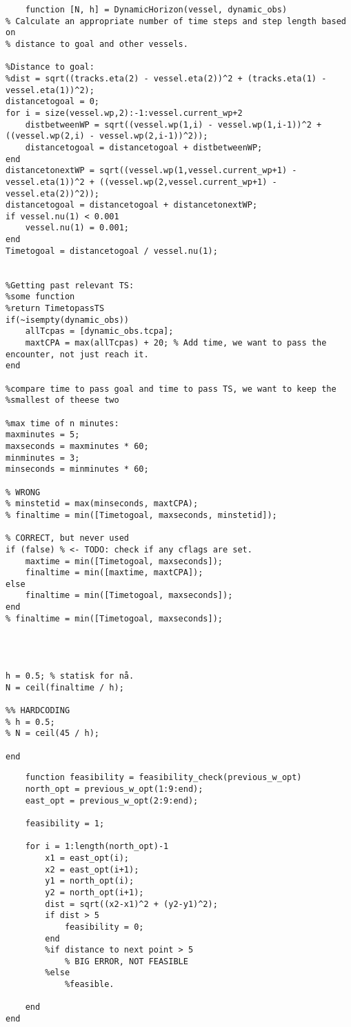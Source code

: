 \clearpage
\begin{lstlisting}
    function [N, h] = DynamicHorizon(vessel, dynamic_obs)
% Calculate an appropriate number of time steps and step length based on
% distance to goal and other vessels.

%Distance to goal:
%dist = sqrt((tracks.eta(2) - vessel.eta(2))^2 + (tracks.eta(1) - vessel.eta(1))^2);
distancetogoal = 0;
for i = size(vessel.wp,2):-1:vessel.current_wp+2
    distbetweenWP = sqrt((vessel.wp(1,i) - vessel.wp(1,i-1))^2 + ((vessel.wp(2,i) - vessel.wp(2,i-1))^2));
    distancetogoal = distancetogoal + distbetweenWP;
end
distancetonextWP = sqrt((vessel.wp(1,vessel.current_wp+1) - vessel.eta(1))^2 + ((vessel.wp(2,vessel.current_wp+1) - vessel.eta(2))^2));
distancetogoal = distancetogoal + distancetonextWP;
if vessel.nu(1) < 0.001
    vessel.nu(1) = 0.001;
end
Timetogoal = distancetogoal / vessel.nu(1);


%Getting past relevant TS:
%some function
%return TimetopassTS
if(~isempty(dynamic_obs))
    allTcpas = [dynamic_obs.tcpa];
    maxtCPA = max(allTcpas) + 20; % Add time, we want to pass the encounter, not just reach it.
end

%compare time to pass goal and time to pass TS, we want to keep the
%smallest of theese two

%max time of n minutes:
maxminutes = 5; 
maxseconds = maxminutes * 60;
minminutes = 3;
minseconds = minminutes * 60;

% WRONG
% minstetid = max(minseconds, maxtCPA);
% finaltime = min([Timetogoal, maxseconds, minstetid]);

% CORRECT, but never used
if (false) % <- TODO: check if any cflags are set.
    maxtime = min([Timetogoal, maxseconds]);
    finaltime = min([maxtime, maxtCPA]); 
else
    finaltime = min([Timetogoal, maxseconds]);
end
% finaltime = min([Timetogoal, maxseconds]);




h = 0.5; % statisk for nå.
N = ceil(finaltime / h);

%% HARDCODING
% h = 0.5;
% N = ceil(45 / h);

end
\end{lstlisting}

\clearpage
\begin{lstlisting}
    function feasibility = feasibility_check(previous_w_opt)
    north_opt = previous_w_opt(1:9:end);
    east_opt = previous_w_opt(2:9:end);

    feasibility = 1;

    for i = 1:length(north_opt)-1
        x1 = east_opt(i);
        x2 = east_opt(i+1);
        y1 = north_opt(i);
        y2 = north_opt(i+1);
        dist = sqrt((x2-x1)^2 + (y2-y1)^2);
        if dist > 5
            feasibility = 0;
        end
        %if distance to next point > 5
            % BIG ERROR, NOT FEASIBLE
        %else
            %feasible.

    end
end 
\end{lstlisting}

